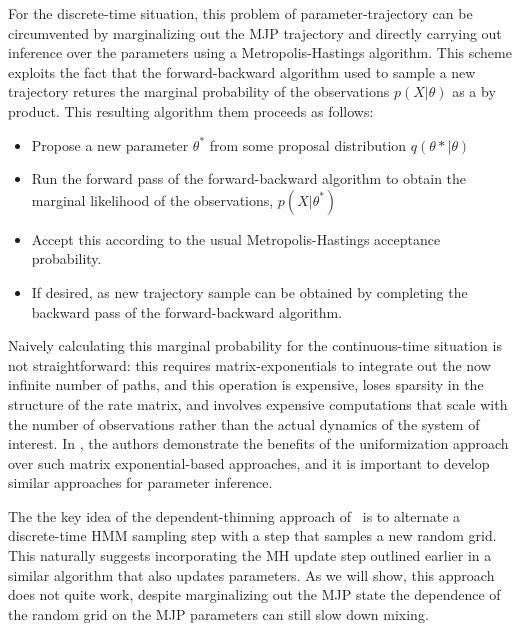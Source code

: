 For the discrete-time situation, this problem of parameter-trajectory can 
be circumvented by marginalizing out the MJP trajectory and directly 
carrying out inference over the parameters using a Metropolis-Hastings 
algorithm.  This scheme exploits the fact that the forward-backward 
algorithm used to sample a new trajectory retures the marginal probability 
of the observations $p(X|\theta)$ as a by product. This resulting 
algorithm them proceeds as follows:

\begin{itemize}
  \item Propose a new parameter $\theta^*$ from some proposal distribution
    $q(\theta*|\theta)$
  \item Run the forward pass of the forward-backward algorithm to 
    obtain the marginal likelihood of the observations, $p(X|\theta^*)$
  \item Accept this according to the usual Metropolis-Hastings acceptance
    probability.
  \item If desired, as new trajectory sample can be obtained by
    completing the backward pass of the forward-backward algorithm.
\end{itemize}

Naively calculating this marginal probability for the continuous-time
situation is not straightforward: this requires matrix-exponentials
to integrate out the now infinite number of paths, and this operation
is expensive, loses sparsity in the structure of the rate matrix,
and involves expensive computations that scale with the number of
observations rather than the actual dynamics of the system of interest.
In \cite{RaoTeh13}, the authors demonstrate the benefits of the
uniformization approach over such matrix exponential-based approaches,
and it is important to develop similar approaches for parameter inference.

The the key idea of the dependent-thinning approach of~\cite{RaoTeh13} is
to alternate a discrete-time HMM sampling step with a step that
samples a new random grid. This naturally suggests incorporating
the MH update step outlined earlier in a similar algorithm that also
updates parameters. As we will show, this approach does not quite
work, despite marginalizing out the MJP state the dependence of the
random grid on the MJP parameters can still slow down mixing.
